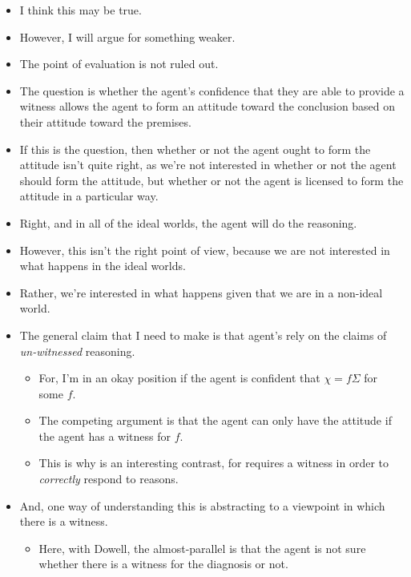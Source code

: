 \documentclass[10pt]{article}
\newcommand{\hozlinedash}[0]{%
  \noindent\hdashrule[0.5ex][c]{\textwidth}{.1pt}{2.5pt}
}
\begin{document}
\begin{itemize}
\item I think this may be true.
\item However, I will argue for something weaker.
\item The point of evaluation is not ruled out.
\end{itemize}

\hozlinedash

\begin{itemize}
\item The question is whether the agent's confidence that they are able to provide a witness allows the agent to form an attitude toward the conclusion based on their attitude toward the premises.
\end{itemize}

\begin{itemize}
\item If this is the question, then whether or not the agent ought to form the attitude isn't quite right, as we're not interested in whether or not the agent should form the attitude, but whether or not the agent is licensed to form the attitude in a particular way.
\item Right, and in all of the ideal worlds, the agent will do the reasoning.
\item However, this isn't the right point of view, because we are not interested in what happens in the ideal worlds.
\item Rather, we're interested in what happens given that we are in a non-ideal world.
\item The general claim that I need to make is that agent's rely on the claims of \emph{un-witnessed} reasoning.
  \begin{itemize}
  \item For, I'm in an okay position if the agent is confident that \(\chi = f\Sigma\) for some \(f\).
  \item The competing argument is that the agent can only have the attitude if the agent has a witness for \(f\).
  \item This is why \citeauthor{Lord:2018aa} is an interesting contrast, for \citeauthor{Lord:2018aa} requires a witness in order to \emph{correctly} respond to reasons.
  \end{itemize}
\item And, one way of understanding this is abstracting to a viewpoint in which there is a witness.
  \begin{itemize}
  \item Here, with Dowell, the almost-parallel is that the agent is not sure whether there is a witness for the diagnosis or not.

\end{itemize}
\end{itemize}
\end{document}
